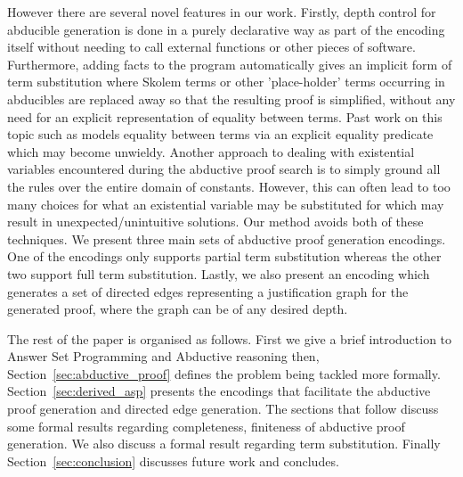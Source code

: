However there are several novel features in our work.  Firstly, depth  control for abducible generation is done in a purely declarative way as part of the encoding itself without needing to call external functions or other pieces of software. Furthermore, adding facts to the program automatically gives an implicit form of term substitution where Skolem terms or
other 'place-holder' terms occurring in abducibles are replaced away so that
the resulting proof is simplified, without any need for an explicit representation of equality between terms. Past work on this topic such as \cite{schueller16:_model_variat_first_order_horn} models equality between terms via an explicit equality predicate which may become unwieldy. Another approach to dealing with existential variables encountered during the abductive proof search is to simply ground all the rules over the entire domain of constants. However, this can often lead to too many choices for what an existential variable may be substituted for which may result in unexpected/unintuitive solutions. Our method avoids both of these techniques. We present three main sets of abductive proof generation encodings. One of the encodings only supports partial term substitution whereas the other two support full term substitution. Lastly, we also present an encoding which generates a set of directed edges representing a justification 
graph  for the generated proof, where the graph can be of any desired depth.

The rest of the paper is organised as
follows. First we give a brief introduction to Answer Set Programming and Abductive reasoning then, Section~\ref{sec:abductive_proof} defines the problem being tackled more formally. Section~\ref{sec:derived_asp} presents the encodings that facilitate the abductive proof generation and directed edge generation. The sections that follow discuss some formal results regarding completeness, finiteness of abductive proof generation. We also discuss a formal result regarding term substitution. Finally Section~\ref{sec:conclusion} discusses
future work and concludes.

